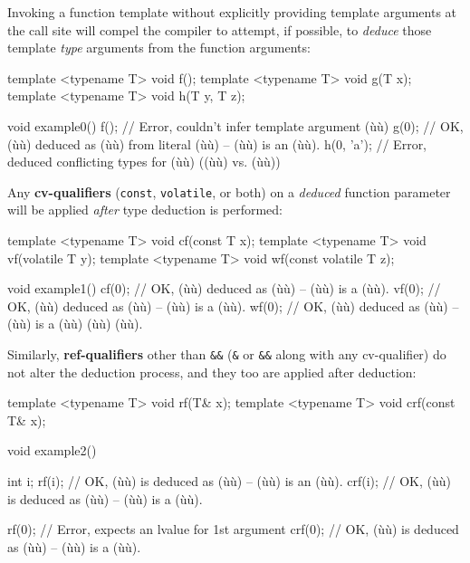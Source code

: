 Invoking a function template without explicitly providing template
arguments at the call site will compel the compiler to attempt, if
possible, to \emph{deduce} those template \emph{type} arguments from the
function arguments:

\begin{emcppslisting}
template <typename T> void f();
template <typename T> void g(T x);
template <typename T> void h(T y, T z);

void example0()
{
    f();        // Error, couldn't infer template argument (ù{}ù)
    g(0);       // OK, (ù{}ù) deduced as (ù{}ù) from literal (ù{}ù) -- (ù{}ù) is an (ù{}ù).
    h(0, 'a');  // Error, deduced conflicting types for (ù{}ù) ((ù{}ù) vs. (ù{}ù))
}
\end{emcppslisting}

\noindent Any \textbf{cv-qualifiers} (\texttt{const}, \texttt{volatile}, or both)
on a \emph{deduced} function parameter will be applied \emph{after} type
deduction is performed:

\begin{emcppslisting}
template <typename T> void cf(const T x);
template <typename T> void vf(volatile T y);
template <typename T> void wf(const volatile T z);

void example1()
{
    cf(0);  // OK, (ù{}ù) deduced as (ù{}ù) -- (ù{}ù) is a (ù{}ù).
    vf(0);  // OK, (ù{}ù) deduced as (ù{}ù) -- (ù{}ù) is a (ù{}ù).
    wf(0);  // OK, (ù{}ù) deduced as (ù{}ù) -- (ù{}ù) is a (ù{}ù) (ù{}ù) (ù{}ù).
}
\end{emcppslisting}

\noindent Similarly, \textbf{ref-qualifiers} other than \texttt{\&\&}
(\texttt{\&} or \texttt{\&\&} along with any cv-qualifier) do not
alter the deduction process, and they too are applied after deduction:

\begin{emcppslisting}
template <typename T> void rf(T& x);
template <typename T> void crf(const T& x);

void example2()
{
    int i;
    rf(i);   // OK, (ù{}ù) is deduced as (ù{}ù) -- (ù{}ù) is an (ù{}ù).
    crf(i);  // OK, (ù{}ù) is deduced as (ù{}ù) -- (ù{}ù) is a (ù{}ù).

    rf(0);   // Error, expects an lvalue for 1st argument
    crf(0);  // OK, (ù{}ù) is deduced as (ù{}ù) -- (ù{}ù) is a (ù{}ù).
}
\end{emcppslisting}

